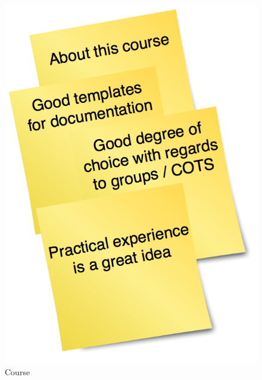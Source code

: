 \documentclass[titlepage,a4paper,11pt]{article}
\begin{document}
\begin{figure}[H]
\begin{minipage}[b]{0.5\linewidth}
        \includegraphics[scale=0.4]{graphics/postit/POS_about_course}
        \caption{Course}
        \label{fig:pos2}
    \end{minipage}
\end{figure}
\end{document}
